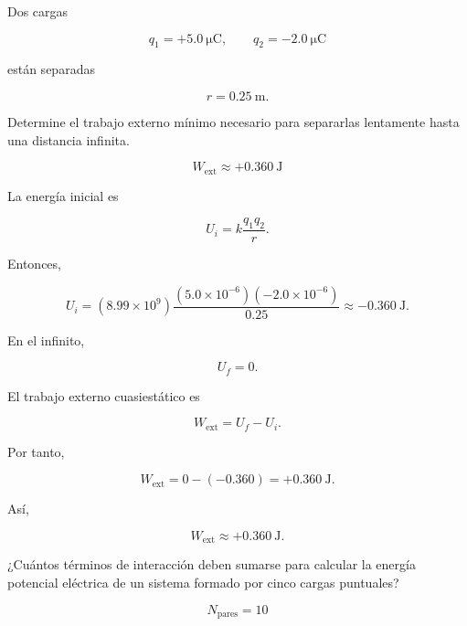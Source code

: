 \begin{ejercicio}

Dos cargas

\[
q_1=+\SI{5.0}{\micro\coulomb},
\qquad
q_2=-\SI{2.0}{\micro\coulomb}
\]

están separadas

\[
r=\SI{0.25}{\metre}.
\]

Determine el trabajo externo mínimo necesario para separarlas lentamente hasta una
distancia infinita.

\end{ejercicio}

\begin{respuesta}

\[
\boxed{W_{\text{ext}}\approx+\SI{0.360}{\joule}}
\]

\end{respuesta}

\begin{explicacion}

La energía inicial es

\[
U_i=k\frac{q_1q_2}{r}.
\]

Entonces,

\[
U_i
=
(8.99\times10^9)
\frac{(5.0\times10^{-6})(-2.0\times10^{-6})}{0.25}
\approx-\SI{0.360}{\joule}.
\]

En el infinito,

\[
U_f=0.
\]

El trabajo externo cuasiestático es

\[
W_{\text{ext}}=U_f-U_i.
\]

Por tanto,

\[
W_{\text{ext}}
=
0-(-0.360)
=
+\SI{0.360}{\joule}.
\]

Así,

\[
\boxed{W_{\text{ext}}\approx+\SI{0.360}{\joule}}.
\]

\end{explicacion}


\begin{ejercicio}

¿Cuántos términos de interacción deben sumarse para calcular la energía potencial
eléctrica de un sistema formado por cinco cargas puntuales?

\end{ejercicio}

\begin{respuesta}

\[
\boxed{N_{\text{pares}}=10}
\]

\end{respuesta}

